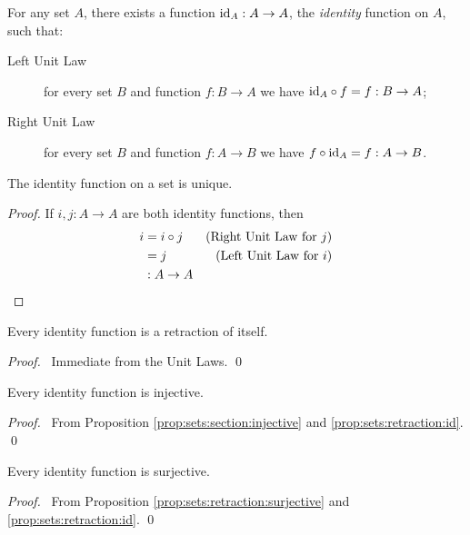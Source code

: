 \begin{ax}
  For any set $A$, there exists a function $\id{A} : A \rightarrow A$, the
  \emph{identity} function on $A$, such that:
  \begin{description}
    \item[Left Unit Law] for every set $B$ and function $f : B \rightarrow A$
    we have $\id{A} \circ f = f : B \rightarrow A$;
    \item[Right Unit Law] for every set $B$ and function $f : A \rightarrow
    B$ we have $f \circ \id{A} = f : A \rightarrow B$.
  \end{description}
\end{ax}

\begin{prop}
  The identity function on a set is unique.
\end{prop}

\begin{proof}
  \pf If $i, j : A \rightarrow A$ are both identity functions, then
  \begin{align*}
    i & = i \circ j & (\text{Right Unit Law for } j) \\
    & = j & (\text{Left Unit Law for } i) \\
    & : A \rightarrow A & \qed
  \end{align*}
\end{proof}

\begin{prop}
\label{prop:sets:retraction:id}
Every identity function is a retraction of itself.
\end{prop}

\begin{proof}
\pf\ Immediate from the Unit Laws. \qed
\end{proof}

\begin{prop}
  \label{prop:sets:identity:injective}
 Every identity function is injective.
\end{prop}

\begin{proof}
  \pf\ From Proposition \ref{prop:sets:section:injective} and
  \ref{prop:sets:retraction:id}. \qed
\end{proof}

\begin{prop}
Every identity function is surjective.
\end{prop}

\begin{proof}
  \pf\ From Proposition \ref{prop:sets:retraction:surjective} and
  \ref{prop:sets:retraction:id}. \qed
\end{proof}

